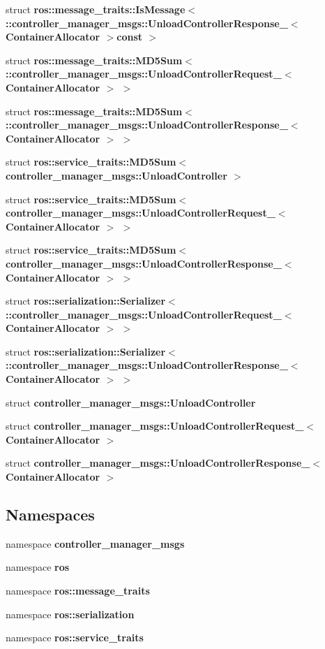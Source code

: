\begin{DoxyCompactItemize}
struct {\bf ros\-::message\-\_\-traits\-::\-Is\-Message$<$ \-::controller\-\_\-manager\-\_\-msgs\-::\-Unload\-Controller\-Response\-\_\-$<$ Container\-Allocator $>$const  $>$}
\item 
struct {\bf ros\-::message\-\_\-traits\-::\-M\-D5\-Sum$<$ \-::controller\-\_\-manager\-\_\-msgs\-::\-Unload\-Controller\-Request\-\_\-$<$ Container\-Allocator $>$ $>$}
\item 
struct {\bf ros\-::message\-\_\-traits\-::\-M\-D5\-Sum$<$ \-::controller\-\_\-manager\-\_\-msgs\-::\-Unload\-Controller\-Response\-\_\-$<$ Container\-Allocator $>$ $>$}
\item 
struct {\bf ros\-::service\-\_\-traits\-::\-M\-D5\-Sum$<$ controller\-\_\-manager\-\_\-msgs\-::\-Unload\-Controller $>$}
\item 
struct {\bf ros\-::service\-\_\-traits\-::\-M\-D5\-Sum$<$ controller\-\_\-manager\-\_\-msgs\-::\-Unload\-Controller\-Request\-\_\-$<$ Container\-Allocator $>$ $>$}
\item 
struct {\bf ros\-::service\-\_\-traits\-::\-M\-D5\-Sum$<$ controller\-\_\-manager\-\_\-msgs\-::\-Unload\-Controller\-Response\-\_\-$<$ Container\-Allocator $>$ $>$}
\item 
struct {\bf ros\-::serialization\-::\-Serializer$<$ \-::controller\-\_\-manager\-\_\-msgs\-::\-Unload\-Controller\-Request\-\_\-$<$ Container\-Allocator $>$ $>$}
\item 
struct {\bf ros\-::serialization\-::\-Serializer$<$ \-::controller\-\_\-manager\-\_\-msgs\-::\-Unload\-Controller\-Response\-\_\-$<$ Container\-Allocator $>$ $>$}
\item 
struct {\bf controller\-\_\-manager\-\_\-msgs\-::\-Unload\-Controller}
\item 
struct {\bf controller\-\_\-manager\-\_\-msgs\-::\-Unload\-Controller\-Request\-\_\-$<$ Container\-Allocator $>$}
\item 
struct {\bf controller\-\_\-manager\-\_\-msgs\-::\-Unload\-Controller\-Response\-\_\-$<$ Container\-Allocator $>$}
\end{DoxyCompactItemize}
\subsection*{\-Namespaces}
\begin{DoxyCompactItemize}
\item 
namespace {\bf controller\-\_\-manager\-\_\-msgs}
\item 
namespace {\bf ros}
\item 
namespace {\bf ros\-::message\-\_\-traits}
\item 
namespace {\bf ros\-::serialization}
\item 
namespace {\bf ros\-::service\-\_\-traits}
\end{DoxyCompactItemize}
